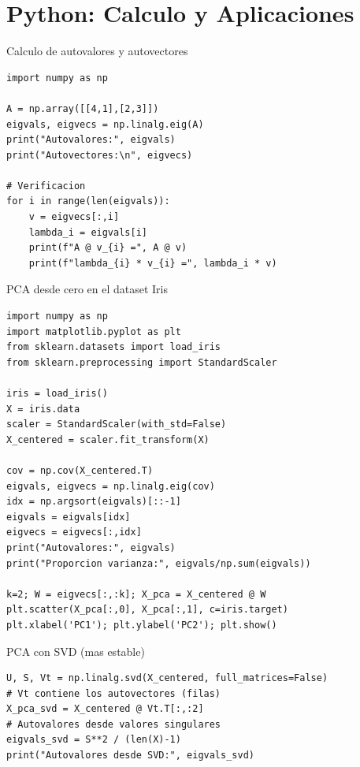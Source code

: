 \documentclass[aspectratio=169, 10pt, xcolor=table]{beamer}
\begin{document}
\section{Python: Calculo y Aplicaciones}

\begin{frame}[fragile]{Calculo de autovalores y autovectores}
    \begin{lstlisting}
import numpy as np

A = np.array([[4,1],[2,3]])
eigvals, eigvecs = np.linalg.eig(A)
print("Autovalores:", eigvals)
print("Autovectores:\n", eigvecs)

# Verificacion
for i in range(len(eigvals)):
    v = eigvecs[:,i]
    lambda_i = eigvals[i]
    print(f"A @ v_{i} =", A @ v)
    print(f"lambda_{i} * v_{i} =", lambda_i * v)
    \end{lstlisting}
\end{frame}

\begin{frame}[fragile]{PCA desde cero en el dataset Iris}
    \begin{lstlisting}
import numpy as np
import matplotlib.pyplot as plt
from sklearn.datasets import load_iris
from sklearn.preprocessing import StandardScaler

iris = load_iris()
X = iris.data
scaler = StandardScaler(with_std=False)
X_centered = scaler.fit_transform(X)

cov = np.cov(X_centered.T)
eigvals, eigvecs = np.linalg.eig(cov)
idx = np.argsort(eigvals)[::-1]
eigvals = eigvals[idx]
eigvecs = eigvecs[:,idx]
print("Autovalores:", eigvals)
print("Proporcion varianza:", eigvals/np.sum(eigvals))

k=2; W = eigvecs[:,:k]; X_pca = X_centered @ W
plt.scatter(X_pca[:,0], X_pca[:,1], c=iris.target)
plt.xlabel('PC1'); plt.ylabel('PC2'); plt.show()
    \end{lstlisting}
\end{frame}

\begin{frame}[fragile]{PCA con SVD (mas estable)}
    \begin{lstlisting}
U, S, Vt = np.linalg.svd(X_centered, full_matrices=False)
# Vt contiene los autovectores (filas)
X_pca_svd = X_centered @ Vt.T[:,:2]
# Autovalores desde valores singulares
eigvals_svd = S**2 / (len(X)-1)
print("Autovalores desde SVD:", eigvals_svd)
    \end{lstlisting}
\end{frame}
\end{document}
